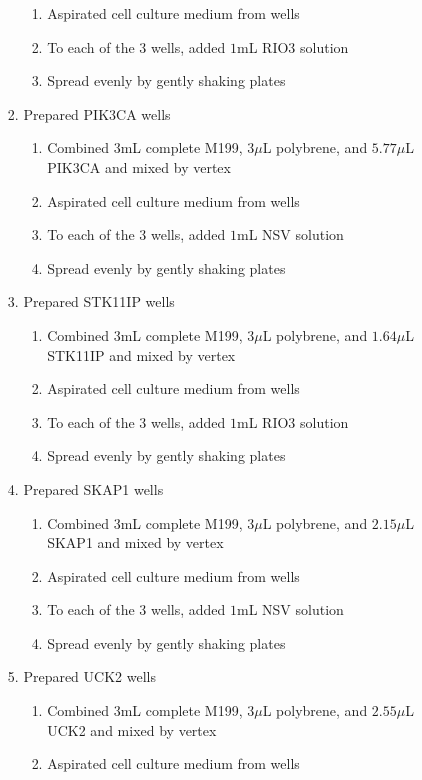 \begin{enumerate}
\begin{enumerate}
\begin{enumerate}
\begin{enumerate}
							\item Aspirated cell culture medium from wells
							\item To each of the 3 wells, added $1$mL RIO3 solution
							\item Spread evenly by gently shaking plates
						\end{enumerate}
					\item Prepared PIK3CA wells
						\begin{enumerate}
							\item Combined $3$mL complete M199, $3\mu$L polybrene, and $5.77\mu$L PIK3CA and mixed by vertex
							\item Aspirated cell culture medium from wells
							\item To each of the 3 wells, added $1$mL NSV solution
							\item Spread evenly by gently shaking plates
						\end{enumerate}
					\item Prepared STK11IP wells
						\begin{enumerate}
							\item Combined $3$mL complete M199, $3\mu$L polybrene, and $1.64\mu$L STK11IP and mixed by vertex
							\item Aspirated cell culture medium from wells
							\item To each of the 3 wells, added $1$mL RIO3 solution
							\item Spread evenly by gently shaking plates
						\end{enumerate}
					\item Prepared SKAP1 wells
						\begin{enumerate}
							\item Combined $3$mL complete M199, $3\mu$L polybrene, and $2.15\mu$L SKAP1 and mixed by vertex
							\item Aspirated cell culture medium from wells
							\item To each of the 3 wells, added $1$mL NSV solution
							\item Spread evenly by gently shaking plates
						\end{enumerate}
					\item Prepared UCK2 wells
						\begin{enumerate}
							\item Combined $3$mL complete M199, $3\mu$L polybrene, and $2.55\mu$L UCK2 and mixed by vertex
							\item Aspirated cell culture medium from wells

\end{enumerate}
\end{enumerate}
\end{enumerate}
\end{enumerate}
